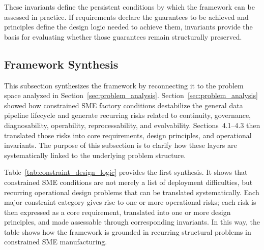 \documentclass[systems,article,submit,pdftex,moreauthors]{Definitions/mdpi}
\begin{document}
These invariants define the persistent conditions by which the framework can be assessed in practice. If requirements declare the guarantees to be achieved and principles define the design logic needed to achieve them, invariants provide the basis for evaluating whether those guarantees remain structurally preserved.

\subsection{Framework Synthesis}
\label{sec:framework_synthesis}

This subsection synthesizes the framework by reconnecting it to the problem space analyzed in Section~\ref{sec:problem_analysis}. Section~\ref{sec:problem_analysis} showed how constrained SME factory conditions destabilize the general data pipeline lifecycle and generate recurring risks related to continuity, governance, diagnosability, operability, reprocessability, and evolvability. Sections~4.1--4.3 then translated those risks into core requirements, design principles, and operational invariants. The purpose of this subsection is to clarify how these layers are systematically linked to the underlying problem structure.

Table~\ref{tab:constraint_design_logic} provides the first synthesis. It shows that constrained SME conditions are not merely a list of deployment difficulties, but recurring operational design problems that can be translated systematically. Each major constraint category gives rise to one or more operational risks; each risk is then expressed as a core requirement, translated into one or more design principles, and made assessable through corresponding invariants. In this way, the table shows how the framework is grounded in recurring structural problems in constrained SME manufacturing.
\end{document}
